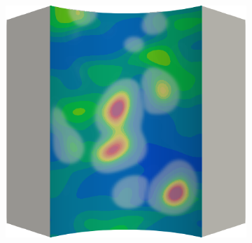 \begin{frame}
\begin{columns}[T]
\begin{column}{0.6\textwidth}
\begin{figure}
{\begin{subfigure}{0.19\textwidth}
          \end{subfigure}
          \hspace{0.06\textwidth}
          \begin{subfigure}{0.19\textwidth}
            \centering
            \includegraphics[width=\textwidth]{examples/figures/ep.0015}
          \end{subfigure}
        }
        

\end{figure}
\end{column}
\end{columns}
\end{frame}

